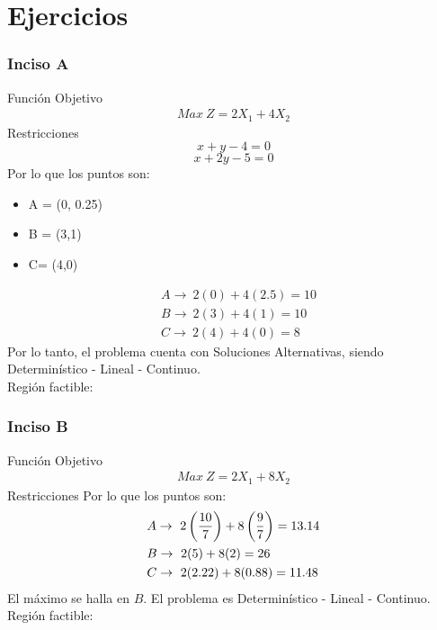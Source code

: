 \documentclass{tarea}
\begin{document}
\caratula
\tableofcontents
\pagebreak


\section{Ejercicios}

\begin{homeworkProblem}
\subsubsection{Inciso A}
Función Objetivo 
\begin{align*}
Max\ Z = 2X_1 + 4X_2
\end{align*}
Restricciones 
\begin{equation}\label{1a1}
		x+y-4=0
\end{equation}
\begin{equation}\label{1a2}
		x + 2y -5 =0
\end{equation}
Por lo que los puntos son:
\begin{itemize}
\item A = (0, 0.25)
\item B = (3,1)
\item C= (4,0)
\end{itemize}
\begin{align*}
&A \rightarrow\ 2(0) + 4(2.5) = 10 \\
&B \rightarrow\ 2(3) + 4(1)   = 10 \\
&C \rightarrow\ 2(4) + 4(0)   =  8
\end{align*}
Por lo tanto, el problema cuenta con Soluciones Alternativas, siendo Determinístico - Lineal - Continuo. \\
Región factible:


\subsubsection{Inciso B}
Función Objetivo 
\begin{align*}
Max\ Z = 2X_1 + 8X_2
\end{align*}
Restricciones
Por lo que los puntos son:
\begin{align*}
&A \rightarrow\ 2\left( \frac{10}{7} \right) + 8\left( \frac{9}{7} \right) =13.14 \\
&B \rightarrow\ 2(5) + 8(2)   = 26 \\
&C \rightarrow\ 2(2.22) + 8(0.88)   =  11.48
\end{align*}
El máximo se halla en $B$. El problema es Determinístico - Lineal - Continuo. \\
Región factible:



\end{homeworkProblem}
\end{document}

